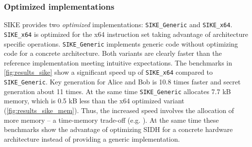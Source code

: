 \subsubsection{Optimized implementations}
\gls{SIKE} provides two \textit{optimized} implementations: \texttt{SIKE\_Generic} and \texttt{SIKE\_x64}. \texttt{SIKE\_x64} is optimized for the x64 instruction set taking advantage of architecture specific operations. \texttt{SIKE\_Generic} implements generic code without optimizing code for a concrete architecture. Both variants are clearly faster than the reference implementation meeting intuitive expectations. The benchmarks in \autoref{fig:results_sike} show a significant speed up of \texttt{SIKE\_x64} compared to \texttt{SIKE\_Generic}. Key generation for Alice and Bob is 10.8 times faster and secret generation about 11 times. At the same time \texttt{SIKE\_Generic} allocates 7.7 \gls{kB} memory, which is 0.5 \gls{kB} less than the x64 optimized variant (\autoref{fig:results_sike_mem}). Thus, the increased speed involves the allocation of more memory -- a time-memory trade-off (e.g. \parencite{1056220}). At the same time these benchmarks show the advantage of optimizing \gls{SIDH} for a concrete hardware architecture instead of providing a generic implementation.

